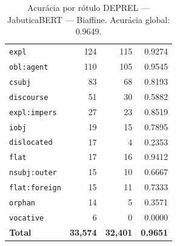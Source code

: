 \begin{table}[ht]
\begin{tabular}{lrrr}
\texttt{expl} & 124 & 115 & 0.9274 \\
\texttt{obl\!:\!agent} & 110 & 105 & 0.9545 \\
\texttt{csubj} & 83 & 68 & 0.8193 \\
\texttt{discourse} & 51 & 30 & 0.5882 \\
\texttt{expl\!:\!impers} & 27 & 23 & 0.8519 \\
\texttt{iobj} & 19 & 15 & 0.7895 \\
\texttt{dislocated} & 17 & 4 & 0.2353 \\
\texttt{flat} & 17 & 16 & 0.9412 \\
\texttt{nsubj\!:\!outer} & 15 & 10 & 0.6667 \\
\texttt{flat\!:\!foreign} & 15 & 11 & 0.7333 \\
\texttt{orphan} & 14 & 5 & 0.3571 \\
\texttt{vocative} & 6 & 0 & 0.0000 \\
\midrule
\textbf{Total} & \textbf{33,574} & \textbf{32,401} & \textbf{0.9651} \\
\bottomrule
\end{tabular}
\caption{Acurácia por rótulo DEPREL — JabuticaBERT — Biaffine. Acurácia global: 0.9649.}
\label{tab:deprel-acc-predict-test-df-jabuticabert-biaffine}
\end{table}


